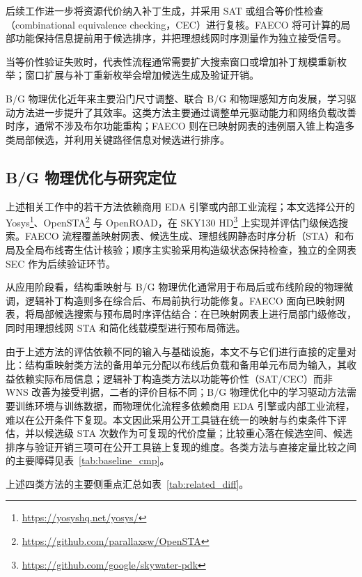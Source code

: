 \documentclass[twocolumn,10pt,fontset=windows]{ctexart}
\begin{document}
后续工作进一步将资源代价纳入补丁生成，并采用 SAT 或组合等价性检查（combinational equivalence checking，CEC）进行复核\cite{jiang2016resource,zhong2024stp}。FAECO 将可计算的局部功能保持信息提前用于候选排序，并把理想线网时序测量作为独立接受信号。

当等价性验证失败时，代表性流程通常需要扩大搜索窗口或增加补丁规模重新枚举\cite{zhuo2018patch}；窗口扩展与补丁重新枚举会增加候选生成及验证开销。

B/G 物理优化近年来主要沿门尺寸调整、联合 B/G 和物理感知方向发展\cite{liu2021rlsizer,huang2025phys,chen2024aito,zhang2025buffalo}，学习驱动方法\cite{chen2024aito,zhang2025buffalo}进一步提升了其效率。这类方法主要通过调整单元驱动能力和网络负载改善时序，通常不涉及布尔功能重构；FAECO 则在已映射网表的违例扇入锥上构造多类局部候选，并利用关键路径信息对候选进行排序。

\subsection{B/G 物理优化与研究定位}
上述相关工作中的若干方法依赖商用 EDA 引擎或内部工业流程；本文选择公开的 Yosys\footnote{\url{https://yosyshq.net/yosys/}}、OpenSTA\footnote{\url{https://github.com/parallaxsw/OpenSTA}} 与 OpenROAD\cite{openroad}，在 SKY130 HD\footnote{\url{https://github.com/google/skywater-pdk}} 上实现并评估门级候选搜索。FAECO 流程覆盖映射网表、候选生成、理想线网静态时序分析（STA）和布局及全局布线寄生估计核验；顺序主实验采用构造级状态保持检查，独立的全网表 SEC 作为后续验证环节。

从应用阶段看，结构重映射与 B/G 物理优化通常用于布局后或布线阶段的物理微调，逻辑补丁构造则多在综合后、布局前执行功能修复。FAECO 面向已映射网表，将局部候选搜索与预布局时序评估结合：在已映射网表上进行局部门级修改，同时用理想线网 STA 和简化线载模型进行预布局筛选。

由于上述方法的评估依赖不同的输入与基础设施，本文不与它们进行直接的定量对比：结构重映射类方法的备用单元分配以布线后负载和备用单元布局为输入，其收益依赖实际布局信息；逻辑补丁构造类方法以功能等价性（SAT/CEC）而非 WNS 改善为接受判据，二者的评价目标不同；B/G 物理优化中的学习驱动方法需要训练环境与训练数据，而物理优化流程多依赖商用 EDA 引擎或内部工业流程，难以在公开条件下复现。本文因此采用公开工具链在统一的映射与约束条件下评估，并以候选级 STA 次数作为可复现的代价度量；比较重心落在候选空间、候选排序与验证开销三项可在公开工具链上复现的维度。各类方法与直接定量比较之间的主要障碍见表~\ref{tab:baseline_cmp}。

上述四类方法的主要侧重点汇总如表~\ref{tab:related_diff}。
\end{document}
